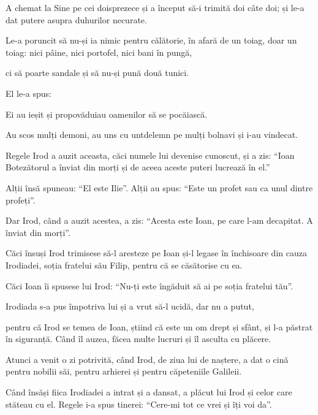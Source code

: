 {A chemat la Sine pe cei doisprezece și a început să-i trimită doi câte doi; și le-a dat putere asupra duhurilor necurate.

Le-a poruncit să nu-și ia nimic pentru călătorie, în afară de un toiag, doar un toiag: nici pâine, nici portofel, nici bani în pungă,

ci să poarte sandale și să nu-și pună două tunici.

El le-a spus:
{}



\par }{\PP {}Ei au ieșit și propovăduiau oamenilor să se pocăiască.

Au scos mulți demoni, au uns cu untdelemn pe mulți bolnavi și i-au vindecat.

Regele Irod a auzit aceasta, căci numele lui devenise cunoscut, și a zis: “Ioan Botezătorul a înviat din morți și de aceea aceste puteri lucrează în el.”

Alții însă spuneau: “El este Ilie”. Alții au spus: “Este un profet sau ca unul dintre profeți”.

Dar Irod, când a auzit acestea, a zis: “Acesta este Ioan, pe care l-am decapitat. A înviat din morți”.

Căci însuși Irod trimisese să-l aresteze pe Ioan și-l legase în închisoare din cauza Irodiadei, soția fratelui său Filip, pentru că se căsătorise cu ea.

Căci Ioan îi spusese lui Irod: “Nu-ți este îngăduit să ai pe soția fratelui tău”.

Irodiada s-a pus împotriva lui și a vrut să-l ucidă, dar nu a putut,

pentru că Irod se temea de Ioan, știind că este un om drept și sfânt, și l-a păstrat în siguranță. Când îl auzea, făcea multe lucruri și îl asculta cu plăcere.


\par }{\PP {}Atunci a venit o zi potrivită, când Irod, de ziua lui de naștere, a dat o cină pentru nobilii săi, pentru arhierei și pentru căpeteniile Galileii.

Când însăși fiica Irodiadei a intrat și a dansat, a plăcut lui Irod și celor care stăteau cu el. Regele i-a spus tinerei: “Cere-mi tot ce vrei și îți voi da”.

}
